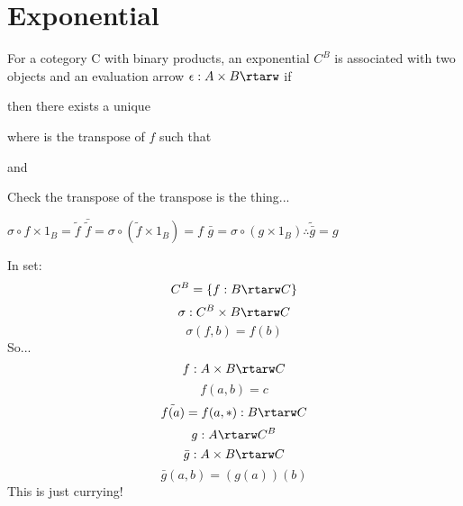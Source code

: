 \section{Exponential}

\begin{definition}
  For a cotegory C with binary products, an exponential $C^B$
  is associated with two objects and an evaluation arrow
  $ \epsilon : A \times B \rtarw $ if
  then there exists a unique
  where  is the transpose of $f$ such that
  and

\end{definition}

Check the transpose of the transpose is the thing...
\begin{center}
  \begin{tabular}

    $ \sigma \circ f \times 1_B = \tilde{f} $
    $ \bar{\tilde{f}} = \sigma \circ ( \tilde{f} \times 1_B ) = f $
    $ \bar{g} = \sigma \circ (g \times 1_B ) \therefore \tilde{\bar{g}} = g $

  \end{tabular}
\end{center}

In set:
$$ C^B = \{ f : B \rtarw C \} $$
$$ \sigma : C^B \times B \rtarw C $$
$$ \sigma (f, b) = f(b) $$
So...
$$ f : A \times B \rtarw C $$
$$ f(a, b) = c $$
$$ \tilde{f(a)} = f(a, *) : B \rtarw C $$
$$ g : A \rtarw C^B $$
$$ \bar{g} : A \times B \rtarw C $$
$$ \bar{g}(a, b) = (g(a))(b) $$
This is just currying!

